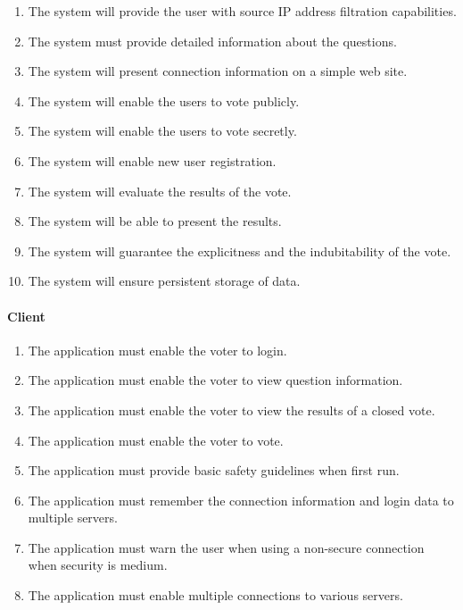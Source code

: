 \documentclass[11pt,twoside,a4paper]{book}
\begin{document}
\begin{enumerate}

\item  The system will provide the user with source IP address filtration capabilities.
\item  The system must provide detailed information about the questions.
\item  The system will present connection information on a simple web site.
\item  The system will enable the users to vote publicly. \cite{bakalarkaJV}
\item  The system will enable the users to vote secretly. \cite{bakalarkaJV}
\item  The system will enable new user registration. \cite{bakalarkaJV}
\item The system will evaluate the results of the vote.\cite{bakalarkaJV}
\item The system will be able to present the results.\cite{bakalarkaJV}
\item The system will guarantee the explicitness and the indubitability of the vote. \cite{bakalarkaJV}
\item The system will ensure persistent storage of data. \cite{bakalarkaJV}
\end{enumerate}
\paragraph*{Client}
\begin{enumerate}
\item The application must enable the voter to login. 
\item The application must enable the voter to view question information.
\item The application must enable the voter to view the results of a closed vote. 
\item The application must enable the voter to vote.
\item The application must provide basic safety guidelines when first run.
\item The application must remember the connection information and login data to multiple servers.
\item The application must warn the user when using a non-secure connection when security is medium.
\item The application must enable multiple connections to various servers.
\end{enumerate}
\end{document}
